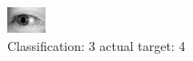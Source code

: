 \begin{figure}[h!]
\begin{center}
\includegraphics[width=0.60\columnwidth]{figures/ID3275_class_3_target_4.png}
\end{center}
\caption{ Classification: 3 actual target: 4}
\label{fig:ID3275_class_3_target_4}
\end{figure}
